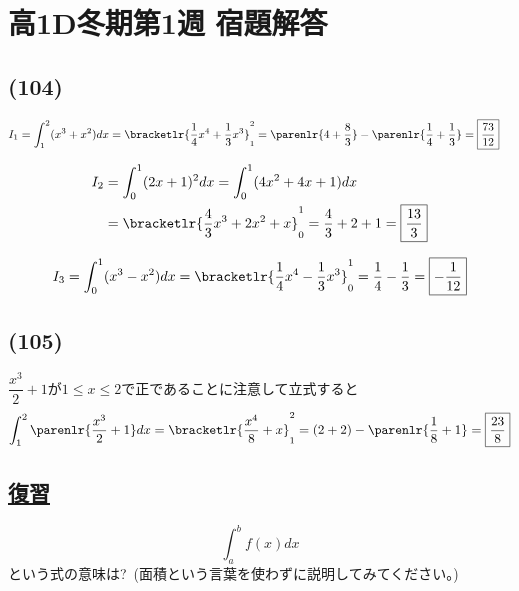 \documentclass[dvipdfmx,uplatex,b5paper]{jsarticle}
\begin{document}
\section*{高1D冬期第1週 宿題解答}
\subsection*{(104)}
\begin{enumarabicp}
  \item \begin{align*}
    I_1&= \int_1^2 (x^3+x^2)dx 
        = \bracketlr{\frac{1}{4}x^4+\frac{1}{3}x^3}_1^2 
        = \parenlr{4+\frac{8}{3}}-\parenlr{\frac{1}{4}+\frac{1}{3}} 
        = \boxed{\frac{73}{12}}
  \end{align*}

  \item \begin{align*}
    I_2&= \int_0^1 (2x+1)^2dx
       = \int _0^1(4x^2+4x+1)dx \\
       &= \bracketlr{\frac{4}{3}x^3+2x^2+x}_0^1
       = \frac{4}{3}+2+1=\boxed{\frac{13}{3}}
  \end{align*}

  \item \begin{align*}
    I_3 = \int_0^1 (x^3-x^2)dx
        = \bracketlr{\frac{1}{4}x^4-\frac{1}{3}x^3}_0^1
        = \frac{1}{4}-\frac{1}{3} = \boxed{-\frac{1}{12}}
  \end{align*}
\end{enumarabicp}

\subsection*{(105)}
$\dfrac{x^3}{2}+1$が$1\leq x\leq 2$で正であることに注意して立式すると
\begin{align*}
  \int_1^2 \parenlr{\frac{x^3}{2}+1}dx = \bracketlr{\frac{x^4}{8}+x}_1^2
  = (2+2)-\parenlr{\frac{1}{8}+1}= \boxed{\frac{23}{8}}
\end{align*}

\subsection*{\underline{復習}}
\[\int_a^b f(x)dx \]
という式の意味は?\ (面積という言葉を使わずに説明してみてください。)
\end{document}
